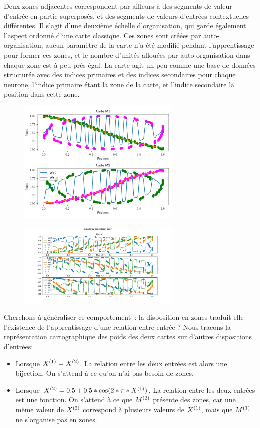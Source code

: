 \documentclass[../main]{subfiles}
\begin{document}
Deux zones adjacentes correspondent par ailleurs à des segments de valeur d'entrée en partie superposés, et des segments de valeurs d'entrées contextuelles différentes. Il s'agit d'une deuxième échelle d'organisation, qui garde également l'aspect ordonné d'une carte classique. Ces zones sont créées par auto-organisation; aucun paramètre de la carte n'a été modifié pendant l'apprentissage pour former ces zones, et le nombre d'unités allouées par auto-organisation dans chaque zone est à peu près égal. La carte agit un peu comme une base de données structurée avec des indices primaires et des indices secondaires pour chaque neurone, l'indice primaire étant la zone de la carte, et l'indice secondaire la position dans cette zone.

\begin{figure}
	\includegraphics[width=0.7\textwidth]{2som_cercle_w.pdf}
\end{figure}

\begin{figure}
	\includegraphics[width=0.7\textwidth]{3som_cercle_w.pdf}
\end{figure}

Cherchons à généraliser ce comportement~: la disposition en zones traduit elle l'existence de l'apprentissage d'une relation entre entrée ?
Nous tracons la représentation cartographique des poids des deux cartes sur d'autres dispositions d'entrées: 
\begin{itemize}
	\item Lorsque $X^{({1})} = X^{({2})}$. La relation entre les deux entrées est alors une bijection. On s'attend à ce qu'on n'ai pas besoin de zones.
	\item Lorsque $X^{({2})} = 0.5+0.5*\cos(2*\pi*X^{({1})})$. La relation entre les deux entrées est une fonction. On s'attend à ce que $M^{({2})}$ présente des zones, car une même valeur de $X^{({2})}$ correspond à plusieurs valeurs de $X^{({1})}$, mais que $M^{({1})}$ ne s'organise pas en zones.
\end{itemize}
\end{document}
